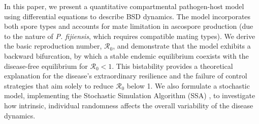 \documentclass[11pt]{article}
\numberwithin{equation}{section}
\begin{document}
In this paper, we present a quantitative compartmental pathogen-host model using differential equations to describe BSD dynamics. The model incorporates both spore types and accounts for mate limitation in ascospore production (due to the nature of \textit{P. fijiensis}, which requires compatible mating types). We derive the basic reproduction number, $\mathcal{R}_0$, and demonstrate that the model exhibits a backward bifurcation, by which a stable endemic equilibrium coexists with the disease-free equilibrium for $\mathcal{R}_0<1$. This bistability provides a theoretical explanation for the disease's extraordinary resilience and the failure of control strategies that aim solely to reduce $\mathcal{R}_0$ below 1.
We also formulate a stochastic model, implementing the Stochastic Simulation Algorithm (SSA) \cite{gillespie}, to investigate how intrinsic, individual randomness affects the overall variability of the disease dynamics.
\end{document}
